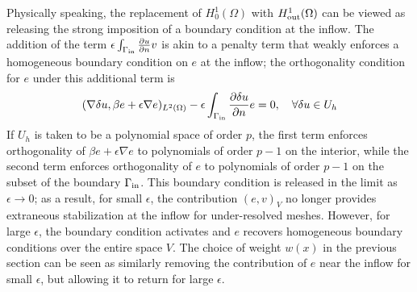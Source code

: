 \documentclass[final,leqno]{siamltex}
\newcommand{\nor}[1]{\left\| #1 \right\|}
\newcommand{\LRp}[1]{\left( #1 \right)}
\newcommand{\Grad} {\ensuremath{\nabla}}
\newcommand{\Div} {\ensuremath{\nabla\cdot}}
\renewcommand{\L}{L^2\LRp{\Omega}}
\newcommand{\del}{\Delta}
\newcommand{\pd}[2]{\frac{\partial#1}{\partial#2}}
\begin{document}
Physically speaking, the replacement of $H^1_0(\Omega)$ with $H^1_{\rm out}(\Omega)$ can be viewed as releasing the strong imposition of a boundary condition at the inflow.  
The addition of the term $\epsilon\int_{\Gamma_{\rm in}} \pd{u}{n}v$ is akin to a penalty term that weakly enforces a homogeneous boundary condition on $e$ at the inflow; the orthogonality condition for $e$ under this additional term is
\[
(\Grad \delta u, \beta e + \epsilon \Grad e)_{\L} - \epsilon\int_{\Gamma_{\rm in}} \pd{\delta u}{n}e = 0, \quad \forall \delta u \in U_h
\]
If $U_h$ is taken to be a polynomial space of order $p$, the first term enforces orthogonality of $\beta e + \epsilon \Grad e$ to polynomials of order $p-1$ on the interior, while the second term enforces orthogonality of $e$ to polynomials of order $p-1$ on the subset of the boundary $\Gamma_{\rm in}$.  %
This boundary condition is released in the limit as $\epsilon \rightarrow 0$; as a result, for small $\epsilon$, the contribution $\LRp{e,v}_V$ no longer provides extraneous stabilization at the inflow for under-resolved meshes.  However, for large $\epsilon$, the boundary condition activates and $e$ recovers homogeneous boundary conditions over the entire space $V$.  The choice of weight $w(x)$ in the previous section can be seen as similarly removing the contribution of $e$ near the inflow for small $\epsilon$, but allowing it to return for large $\epsilon$.  
\end{document}
